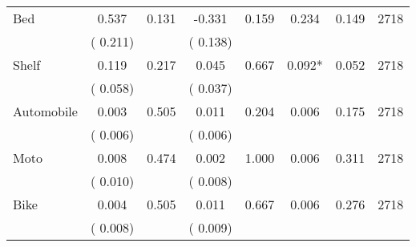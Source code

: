 \begin{tabular}{l*{7}{c}}
 Bed       &              0.537       &        0.131  &             -0.331       &        0.159  &              0.234       &              0.149 &  2718 \\ 
                       &       (       0.211)             &                               &       (       0.138)                     &                               &                                               &                                &                      \\ 

 Shelf       &              0.119       &        0.217  &              0.045       &        0.667  &              0.092*       &              0.052 &  2718 \\ 
                       &       (       0.058)             &                               &       (       0.037)                     &                               &                                               &                                &                      \\ 

 Automobile       &              0.003       &        0.505  &              0.011       &        0.204  &              0.006       &              0.175 &  2718 \\ 
                       &       (       0.006)             &                               &       (       0.006)                     &                               &                                               &                                &                      \\ 

 Moto       &              0.008       &        0.474  &              0.002       &        1.000  &              0.006       &              0.311 &  2718 \\ 
                       &       (       0.010)             &                               &       (       0.008)                     &                               &                                               &                                &                      \\ 

 Bike       &              0.004       &        0.505  &              0.011       &        0.667  &              0.006       &              0.276 &  2718 \\ 
                       &       (       0.008)             &                               &       (       0.009)                     &                               &                                               &                                &                      \\ 


\end{tabular}
